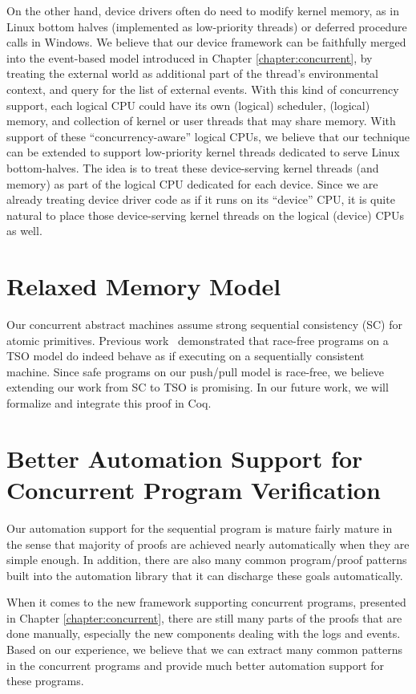 On the other hand, device drivers often do need to modify kernel memory, as in Linux
bottom halves (implemented as low-priority threads) or deferred
procedure calls in Windows. We believe that our device framework
can be faithfully merged into the event-based model introduced in
Chapter \ref{chapter:concurrent}, by treating the external world as additional
part of the thread's environmental context, and query for the list of external
events. 
With this kind of concurrency support, each logical CPU could have
its own (logical) scheduler,
(logical) memory, and collection of kernel or user threads that may share memory.
With support of these
``concurrency-aware'' logical CPUs, we believe that our technique can
be extended to support low-priority kernel threads dedicated to serve
Linux bottom-halves. The idea is to treat these device-serving kernel
threads (and memory) as part of the logical CPU dedicated for each
device. Since we are already treating device driver code as if it runs
on its ``device'' CPU, it is quite natural to place those
device-serving kernel threads on the logical (device) CPUs as well.

\section{Relaxed Memory Model}
Our concurrent abstract machines assume strong sequential consistency (SC)
for atomic primitives. 
Previous work~\cite{SewellSONM10} demonstrated that race-free programs on a TSO model do indeed behave as if executing on a
sequentially consistent machine. Since safe programs on our push/pull model is race-free, we believe extending our work from SC to TSO is promising. In our future work, we will formalize and integrate this proof in Coq.

\section{Better Automation Support for Concurrent Program Verification}
Our automation support for the sequential program is mature fairly mature
in the sense that majority of proofs are achieved nearly automatically
when they are simple enough. In addition, there are also many
common program/proof patterns built into the automation library that
it can discharge these goals automatically. 

When it comes to the new framework supporting concurrent programs, presented
in Chapter \ref{chapter:concurrent}, there are still many parts of the proofs
that are done manually, especially the new components dealing with the logs
and events. Based on our experience, we believe that we can extract
many common patterns in the concurrent programs and provide much better
automation support for these programs.

